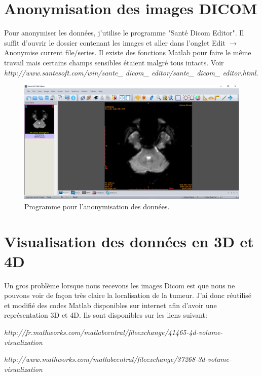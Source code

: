 \chapter{Anonymisation des images DICOM}

Pour anonymiser les données, j'utilise le programme "Santé Dicom Editor". Il suffit d'ouvrir le dossier contenant les images et aller dans l'onglet Edit $\rightarrow$ Anonymise current file/series. Il existe des fonctions Matlab pour faire le même travail mais certains champs sensibles étaient malgré tous intacts. Voir \textit{http://www.santesoft.com/win/sante\_ dicom\_ editor/sante\_ dicom\_ editor.html}.

\begin{figure}[H]
\centering
    \includegraphics[scale=0.35,angle=90]{Images/AnonExe.png}
    \caption{Programme pour l'anonymisation des données.}
    \label{fig:AnonExe}
\end{figure}

\chapter{Visualisation des données en 3D et 4D}

Un gros problème lorsque nous recevons les images Dicom est que nous ne pouvons voir de façon très claire la localisation de la tumeur. J'ai donc réutilisé et modifié des codes Matlab disponibles sur internet afin d'avoir une représentation 3D et 4D. Ils sont disponibles sur les liens suivant:

\medskip

\textit{http://fr.mathworks.com/matlabcentral/fileexchange/41465-4d-volume-visualization}

\textit{http://www.mathworks.com/matlabcentral/fileexchange/37268-3d-volume-visualization}



